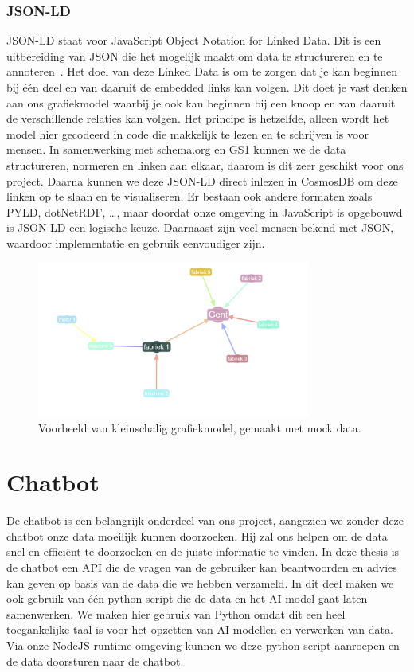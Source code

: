 \subsubsection{JSON-LD}
JSON-LD staat voor JavaScript Object Notation for Linked Data. Dit is een uitbereiding van JSON die het mogelijk maakt om data te structureren en te annoteren~\autocite{jsonld.org}.
Het doel van deze Linked Data is om te zorgen dat je kan beginnen bij één deel en van daaruit de embedded links kan volgen. 
Dit doet je vast denken aan ons grafiekmodel waarbij je ook kan beginnen bij een knoop en van daaruit de verschillende relaties kan volgen.
Het principe is hetzelfde, alleen wordt het model hier gecodeerd in code die makkelijk te lezen en te schrijven is voor mensen.
In samenwerking met schema.org en GS1 kunnen we de data structureren, normeren en linken aan elkaar, daarom is dit zeer geschikt voor ons project. 
Daarna kunnen we deze JSON-LD direct inlezen in CosmosDB om deze linken op te slaan en te visualiseren.
Er bestaan ook andere formaten zoals PYLD, dotNetRDF, \dots, maar doordat onze omgeving in JavaScript is opgebouwd is JSON-LD een logische keuze.
Daarnaast zijn veel mensen bekend met JSON, waardoor implementatie en gebruik eenvoudiger zijn.

\begin{figure}[h]
     \centering
     \includegraphics[width=0.8\textwidth]{./img/grapmodel_example.png}
     \caption[Voorbeeld Grafiekmodel.]{\label{fig:graphmodel}Voorbeeld van kleinschalig grafiekmodel, gemaakt met mock data.}
\end{figure}

\section{Chatbot}
De chatbot is een belangrijk onderdeel van ons project, aangezien we zonder deze chatbot onze data moeilijk kunnen doorzoeken.
Hij zal ons helpen om de data snel en efficiënt te doorzoeken en de juiste informatie te vinden.
In deze thesis is de chatbot een API die de vragen van de gebruiker kan beantwoorden en advies kan geven op basis van de data die we hebben verzameld.
In dit deel maken we ook gebruik van één python script die de data en het AI model gaat laten samenwerken.
We maken hier gebruik van Python omdat dit een heel toegankelijke taal is voor het opzetten van AI modellen en verwerken van data.
Via onze NodeJS runtime omgeving kunnen we deze python script aanroepen en de data doorsturen naar de chatbot.

